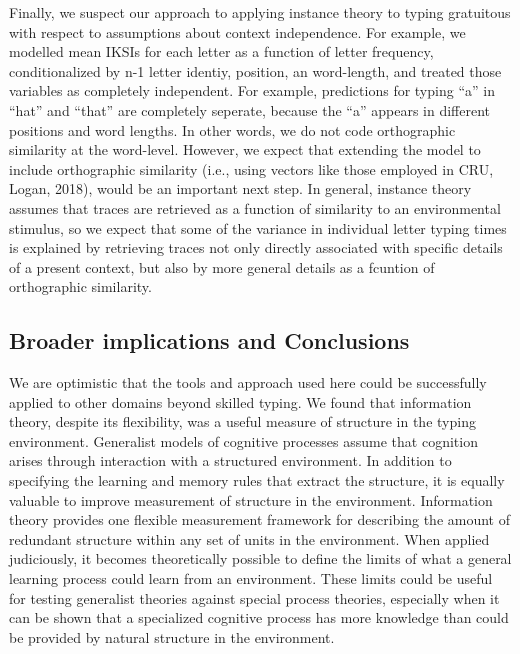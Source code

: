 \documentclass[,man,floatsintext]{apa6}
\begin{document}
Finally, we suspect our approach to applying instance theory to typing gratuitous with respect to assumptions about context independence. For example, we modelled mean IKSIs for each letter as a function of letter frequency, conditionalized by n-1 letter identiy, position, an word-length, and treated those variables as completely independent. For example, predictions for typing \enquote{a} in \enquote{hat} and \enquote{that} are completely seperate, because the \enquote{a} appears in different positions and word lengths. In other words, we do not code orthographic similarity at the word-level. However, we expect that extending the model to include orthographic similarity (i.e., using vectors like those employed in CRU, Logan, 2018), would be an important next step. In general, instance theory assumes that traces are retrieved as a function of similarity to an environmental stimulus, so we expect that some of the variance in individual letter typing times is explained by retrieving traces not only directly associated with specific details of a present context, but also by more general details as a fcuntion of orthographic similarity.

\hypertarget{broader-implications-and-conclusions}{%
\subsection{Broader implications and Conclusions}\label{broader-implications-and-conclusions}}

We are optimistic that the tools and approach used here could be successfully applied to other domains beyond skilled typing. We found that information theory, despite its flexibility, was a useful measure of structure in the typing environment. Generalist models of cognitive processes assume that cognition arises through interaction with a structured environment. In addition to specifying the learning and memory rules that extract the structure, it is equally valuable to improve measurement of structure in the environment. Information theory provides one flexible measurement framework for describing the amount of redundant structure within any set of units in the environment. When applied judiciously, it becomes theoretically possible to define the limits of what a general learning process could learn from an environment. These limits could be useful for testing generalist theories against special process theories, especially when it can be shown that a specialized cognitive process has more knowledge than could be provided by natural structure in the environment.
\end{document}
